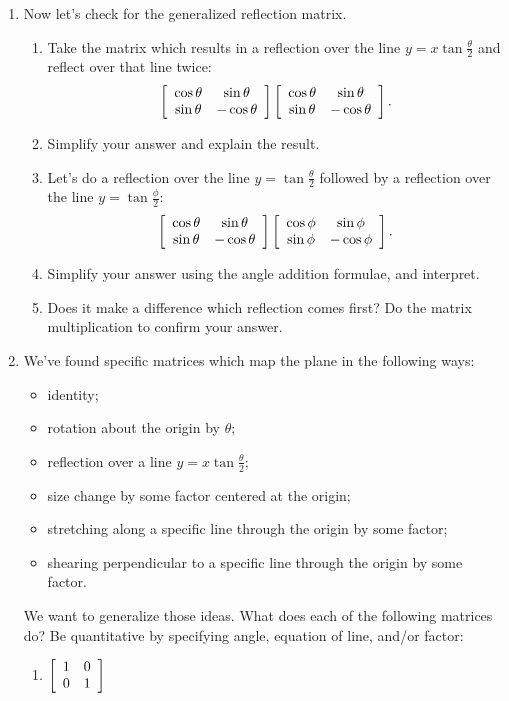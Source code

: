\documentclass[../gatm.tex]{subfiles}
\begin{document}
\begin{enumerate}
\begin{enumerate}
\end{enumerate}
\item Now let's check for the generalized reflection matrix.
\begin{enumerate}
\item Take the matrix which results in a reflection over the line $y=x\tan \frac{\theta}{2}$ and reflect over that line twice: $$\left[\begin{array}{cc} \cos\theta & \sin\theta \\ \sin\theta & -\cos\theta \end{array}\right]\left[\begin{array}{cc} \cos\theta & \sin\theta \\ \sin\theta & -\cos\theta \end{array}\right].$$
\item Simplify your answer and explain the result.
\item Let's do a reflection over the line $y=\tan\frac{\theta}{2}$ followed by a reflection over the line $y=\tan\frac{\phi}{2}$:
$$\left[\begin{array}{cc} \cos\theta & \sin\theta \\ \sin\theta & -\cos\theta \end{array}\right]\left[\begin{array}{cc} \cos\phi & \sin\phi \\ \sin\phi & -\cos\phi \end{array}\right].$$
\item Simplify your answer using the angle addition formulae, and interpret.
\item Does it make a difference which reflection comes first? Do the matrix multiplication to confirm your answer.
\end{enumerate}
\item We've found specific matrices which map the plane in the following ways:
\setcounter{problem_i}{\value{enumi}}
\begin{itemize}
\item identity; %
\item rotation about the origin by $\theta$; %
\item reflection over a line $y=x \tan\frac{\theta}{2}$; %
\item size change by some factor centered at the origin; %
\item stretching along a specific line through the origin by some factor; %
\item shearing perpendicular to a specific line through the origin by some factor. %
\end{itemize}
\setcounter{enumi}{\value{problem_i}}
We want to generalize those ideas. What does each of the following matrices do? Be quantitative by specifying angle, equation of line, and/or factor:\label{prob:list_transformations}
\begin{multicols}{3}
\begin{enumerate}
\item $\left[\begin{array}{cc} 1 & 0 \\ 0 & 1 \end{array}\right]$ \label{prob:list_transformations_part_start}

\end{enumerate}
\end{multicols}
\end{enumerate}
\end{document}
